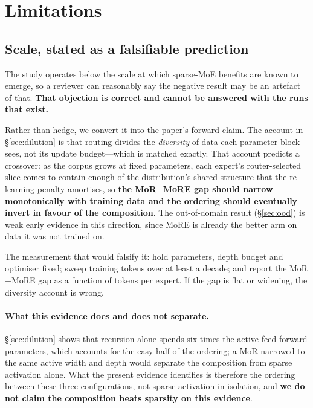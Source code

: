 \section{Limitations}
\label{sec:limitations}
\label{page:limitations_start}

\subsection{Scale, stated as a falsifiable prediction}

The study operates below the scale at which sparse-MoE benefits are known to
emerge, so a reviewer can reasonably say the negative result may be an artefact of
that. \textbf{That objection is correct and cannot be answered with the runs that
exist.}

Rather than hedge, we convert it into the paper's forward claim. The account in
\S\ref{sec:dilution} is that routing divides the \emph{diversity} of data each
parameter block sees, not its update budget---which is matched exactly. That
account predicts a crossover: as the corpus grows at fixed parameters, each
expert's router-selected slice comes to contain enough of the distribution's shared
structure that the re-learning penalty amortises, so
\textbf{the MoR$-$MoRE gap should narrow monotonically with training data and the
ordering should eventually invert in favour of the composition}. The out-of-domain
result (\S\ref{sec:ood}) is weak early evidence in this direction, since MoRE is
already the better arm on data it was not trained on.

The measurement that would falsify it: hold parameters, depth budget and optimiser
fixed; sweep training tokens over at least a decade; and report the MoR$-$MoRE gap
as a function of tokens per expert. If the gap is flat or widening, the diversity
account is wrong.

\paragraph{What this evidence does and does not separate.}
\S\ref{sec:dilution} shows that recursion alone spends six times the active
feed-forward parameters, which accounts for the easy half of the ordering; a MoR
narrowed to the same active width and depth would separate the composition from
sparse activation alone. What the present evidence identifies is therefore the
ordering between these three configurations, not sparse activation in isolation,
and \textbf{we do not claim the composition beats sparsity on this evidence}.

